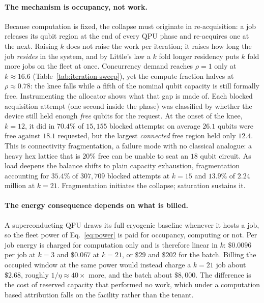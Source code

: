 \paragraph{The mechanism is occupancy, not work.}
Because computation is fixed, the collapse must originate in re-acquisition: a job releases its qubit region at the end of every QPU phase and re-acquires one at the next. Raising $k$ does not raise the work per iteration; it raises how long the job \emph{resides} in the system, and by Little's law a $k$ fold longer residency puts $k$ fold more jobs on the fleet at once. Concurrency demand reaches $\rho = 1$ only at $k \approx 16.6$ (Table~\ref{tab:iteration-sweep}), yet the compute fraction halves at $\rho \approx 0.78$: the knee falls while a fifth of the nominal qubit capacity is still formally free. Instrumenting the allocator shows what that gap is made of. Each blocked acquisition attempt (one second inside the phase) was classified by whether the device still held enough \emph{free} qubits for the request. At the onset of the knee, $k=12$, it did in $70.4\%$ of $15{,}155$ blocked attempts: on average $26.1$ qubits were free against $18.1$ requested, but the largest \emph{connected} free region held only $12.4$. This is connectivity fragmentation, a failure mode with no classical analogue: a heavy hex lattice that is $20\%$ free can be unable to seat an $18$ qubit circuit. As load deepens the balance shifts to plain capacity exhaustion, fragmentation accounting for $35.4\%$ of $307{,}709$ blocked attempts at $k=15$ and $13.9\%$ of $2.24$ million at $k=21$. Fragmentation initiates the collapse; saturation sustains it.

\paragraph{The energy consequence depends on what is billed.}
A superconducting QPU draws its full cryogenic baseline whenever it hosts a job, so the fleet power of Eq.~\eqref{eq:power} is paid for occupancy, computing or not. Per job energy is charged for computation only and is therefore linear in $k$: $\$0.0096$ per job at $k=3$ and $\$0.067$ at $k=21$, or $\$29$ and $\$202$ for the batch. Billing the occupied window at the same power would instead charge a $k=21$ job about $\$2.68$, roughly $1/\eta \approx 40\times$ more, and the batch about $\$8{,}000$. The difference is the cost of reserved capacity that performed no work, which under a computation based attribution falls on the facility rather than the tenant.


